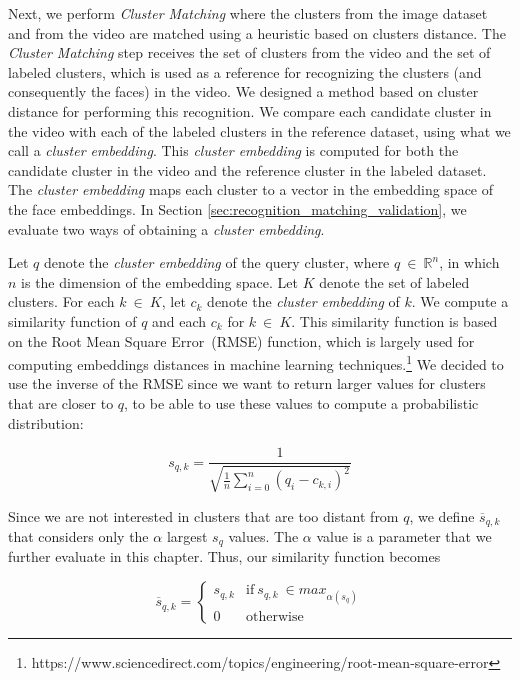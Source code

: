 Next, we perform \emph{Cluster Matching} where the clusters from the image dataset and from the video are matched using a heuristic based on clusters distance.
The \textit{Cluster Matching} step receives the set of clusters from the video and the set of labeled clusters, which is used as a reference for recognizing the clusters (and consequently the faces) in the video.
We designed a method based on cluster distance for performing this recognition.
We compare each candidate cluster in the video with each of the labeled clusters in the reference dataset, using what we call a \emph{cluster embedding}. This \emph{cluster embedding} is computed for both the candidate cluster in the video and the reference cluster in the labeled dataset.
The \emph{cluster embedding} maps each cluster to a vector in the embedding space of the face embeddings.
In Section \ref{sec:recognition_matching_validation}, we evaluate two ways of obtaining a \emph{cluster embedding}.

Let $q$ denote the \emph{cluster embedding} of the query cluster, where $q~\in~\mathbb{R}^{n}$, in which $n$ is the dimension of the embedding space.
Let $K$ denote the set of labeled clusters. For each $k~\in~K$, let $c_k$ denote the \emph{cluster embedding} of $k$. 
We compute a similarity function of $q$ and each $c_k$ for $k~\in~K$. 
This similarity function is based on the Root Mean Square Error~(RMSE) function, which is largely used for computing embeddings distances in machine learning techniques.\footnote{https://www.sciencedirect.com/topics/engineering/root-mean-square-error}
We decided to use the inverse of the RMSE since we want to return larger values for clusters that are closer to $q$, to be able to use these values to compute a probabilistic distribution:

\begin{equation}
\label{equation:similarity_raw}
    s_{q,k} = \frac{1}{\sqrt{\frac{1}{n}\sum_{i=0}^{n}{(q_i-c_{k,i})^2}}}
\end{equation}

Since we are not interested in clusters that are too distant from $q$, we define $\overline{s}_{q,k}$ that considers only the $\alpha$ largest $s_q$ values. The $\alpha$ value is a parameter that we further evaluate in this chapter. 
Thus, our similarity function becomes

\begin{equation}
\label{equation:similarity}
    \overline{s}_{q,k} = \begin{cases}s_{q,k} & \text{if}~s_{q,k}~\in max_{\alpha(s_q)}\\0 & \text{otherwise}\end{cases}
\end{equation}

